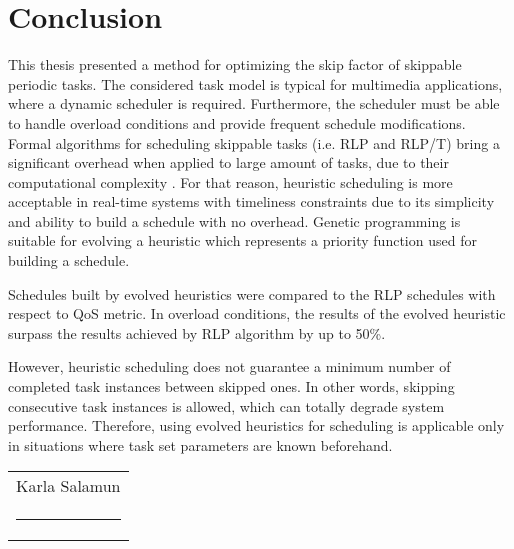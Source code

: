 \chapter*{Conclusion}
This thesis presented a method for optimizing the skip factor of skippable periodic tasks.
The considered task model is typical for multimedia applications, where a dynamic scheduler is required.
Furthermore, the scheduler must be able to handle overload conditions and provide frequent schedule modifications.
Formal algorithms for scheduling skippable tasks (i.e. RLP and RLP/T) bring a significant overhead when applied to large amount of tasks, due to their computational complexity \cite{onqos}.
For that reason, heuristic scheduling is more acceptable in real-time systems with timeliness constraints due to its simplicity and ability to build a schedule with no overhead.
Genetic programming is suitable for evolving a heuristic which represents a priority function used for building a schedule.

Schedules built by evolved heuristics were compared to the RLP schedules with respect to QoS metric.
In overload conditions, the results of the evolved heuristic surpass the results achieved by RLP algorithm by up to 50\%.

However, heuristic scheduling does not guarantee a minimum number of completed task instances between skipped ones.
In other words, skipping consecutive task instances is allowed, which can totally degrade system performance.
Therefore, using evolved heuristics for scheduling is applicable only in situations where task set parameters are known beforehand.

\newcommand{\namesigdate}[2][5cm]{%
  \begin{tabular}{@{}p{#1}@{}}
    #2 \\[2\normalbaselineskip] \hrule \\[15pt]
  \end{tabular}}

\vspace*{\fill} \noindent \hfill \namesigdate{Karla Salamun}